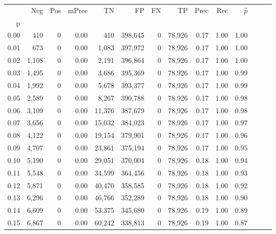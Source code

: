 \begin{tabular}{rrrrrrrrrrrrrr}
\toprule
{} &    Neg &    Pos & mPrec &       TN &       FP &      FN &      TP &  Prec &   Rec & $\hat{p}$ \\
p    &        &        &       &          &          &         &         &       &       &           \\
\midrule
0.00 &    410 &      0 &  0.00 &      410 &  398,645 &       0 &  78,926 &  0.17 &  1.00 &      1.00 \\
0.01 &    673 &      0 &  0.00 &    1,083 &  397,972 &       0 &  78,926 &  0.17 &  1.00 &      1.00 \\
0.02 &  1,108 &      0 &  0.00 &    2,191 &  396,864 &       0 &  78,926 &  0.17 &  1.00 &      1.00 \\
0.03 &  1,495 &      0 &  0.00 &    3,686 &  395,369 &       0 &  78,926 &  0.17 &  1.00 &      0.99 \\
0.04 &  1,992 &      0 &  0.00 &    5,678 &  393,377 &       0 &  78,926 &  0.17 &  1.00 &      0.99 \\
0.05 &  2,589 &      0 &  0.00 &    8,267 &  390,788 &       0 &  78,926 &  0.17 &  1.00 &      0.98 \\
0.06 &  3,109 &      0 &  0.00 &   11,376 &  387,679 &       0 &  78,926 &  0.17 &  1.00 &      0.98 \\
0.07 &  3,656 &      0 &  0.00 &   15,032 &  384,023 &       0 &  78,926 &  0.17 &  1.00 &      0.97 \\
0.08 &  4,122 &      0 &  0.00 &   19,154 &  379,901 &       0 &  78,926 &  0.17 &  1.00 &      0.96 \\
0.09 &  4,707 &      0 &  0.00 &   23,861 &  375,194 &       0 &  78,926 &  0.17 &  1.00 &      0.95 \\
0.10 &  5,190 &      0 &  0.00 &   29,051 &  370,004 &       0 &  78,926 &  0.18 &  1.00 &      0.94 \\
0.11 &  5,548 &      0 &  0.00 &   34,599 &  364,456 &       0 &  78,926 &  0.18 &  1.00 &      0.93 \\
0.12 &  5,871 &      0 &  0.00 &   40,470 &  358,585 &       0 &  78,926 &  0.18 &  1.00 &      0.92 \\
0.13 &  6,296 &      0 &  0.00 &   46,766 &  352,289 &       0 &  78,926 &  0.18 &  1.00 &      0.90 \\
0.14 &  6,609 &      0 &  0.00 &   53,375 &  345,680 &       0 &  78,926 &  0.19 &  1.00 &      0.89 \\
0.15 &  6,867 &      0 &  0.00 &   60,242 &  338,813 &       0 &  78,926 &  0.19 &  1.00 &      0.87 \\

\end{tabular}

